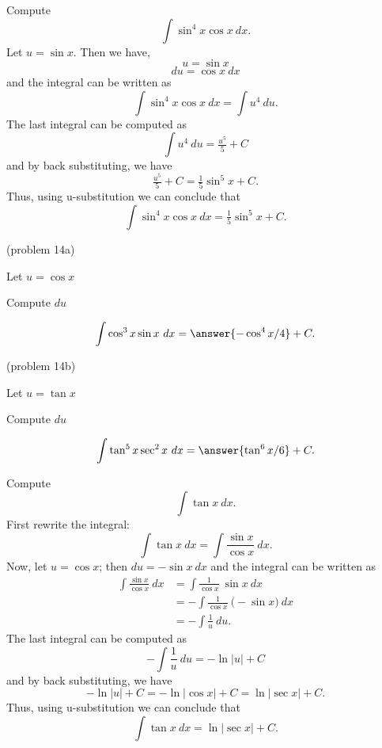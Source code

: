 \documentclass[handout]{ximera}
\begin{document}
\begin{example}[example 14] Compute 
\[\int \sin^4 x\cos x \ dx.\]
Let $u = \sin x$. Then we have,
\[u = \sin x\]
\[du = \cos x \ dx\]
and the integral can be written as 
\[\int \sin^4 x\cos x \ dx  = \int u^4 \ du.\]
The last integral can be computed as 
\[\int u^4 \ du = \tfrac{u^5}{5} + C\]
and by back substituting, we have 
\[\tfrac{u^5}{5} + C = \tfrac15 \sin^5 x + C.\]
Thus, using u-substitution we can conclude that
\[\int \sin^4 x\cos x \ dx =  \tfrac15 \sin^5 x + C.\]
\end{example}



\begin{problem}(problem 14a)
\begin{hint}
Let $u = \cos x$
\end{hint}
\begin{hint}
Compute $du$
\end{hint}
\[\int \cos^3 x\sin x \ dx = \answer{-\cos^4 x/4} +C.\]
\end{problem}



\begin{problem}(problem 14b)
\begin{hint}
Let $u = \tan x$
\end{hint}
\begin{hint}
Compute $du$
\end{hint}
\[\int \tan^5 x\sec^2 x \ dx = \answer{\tan^6 x/6} +C.\]
\end{problem}



\begin{example}[example 15] Compute 
\[\int \tan x \ dx.\]
First rewrite the integral:
\[\int \tan x \ dx =\int \frac{\sin x}{\cos x} \ dx.\]
Now, let $u = \cos x$; then $du = -\sin x \ dx$
and the integral can be written as
\begin{align*}
\int \frac{\sin x}{\cos x} \ dx &= \int \frac{1}{\cos x}\ \sin x \  dx \\
 &=  - \int \frac{1}{\cos x}\ \big(-\sin x\big) \  dx\\
&=-\int \frac{1}{u} \ du.
\end{align*}
The last integral can be computed as 
\[-\int \frac{1}{u} \ du = -\ln|u| + C\]
and by back substituting, we have 
\[-\ln|u| + C = -\ln|\cos x| + C = \ln|\sec x| +C.\]
Thus, using u-substitution we can conclude that
\[\int \tan x \ dx =  \ln|\sec x| + C.\]
\end{example}
\end{document}
